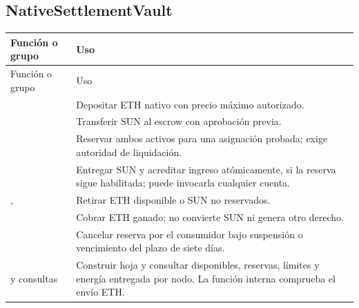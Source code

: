 \subsection{NativeSettlementVault}
\begin{longtable}{L{.37\linewidth}L{.53\linewidth}}
\toprule Función o grupo & Uso \\ \midrule\endfirsthead
\toprule Función o grupo & Uso \\ \midrule\endhead
{} & Depositar ETH nativo con precio máximo autorizado.\\
 & Transferir SUN al escrow con aprobación previa.\\
 & Reservar ambos activos para una asignación probada; exige autoridad de liquidación.\\
 & Entregar SUN y acreditar ingreso atómicamente, si la reserva sigue habilitada; puede invocarla cualquier cuenta.\\
,  & Retirar ETH disponible o SUN no reservados.\\
 & Cobrar ETH ganado; no convierte SUN ni genera otro derecho.\\
 & Cancelar reserva por el consumidor bajo suspensión o vencimiento del plazo de siete días.\\
 y consultas & Construir hoja y consultar disponibles, reservas, límites y energía entregada por nodo. La función interna  comprueba el envío ETH.\\
\bottomrule
\end{longtable}


